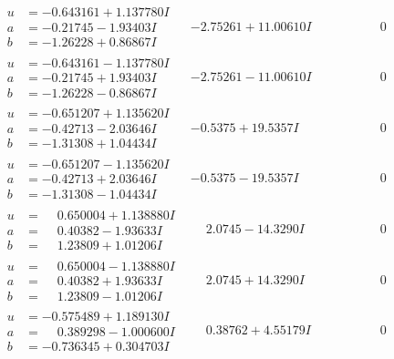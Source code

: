 \documentclass[1p]{elsarticle_modified}
\theoremstyle{definition}
\begin{document}
$$\begin{array}{c|c|c}
\begin{aligned}
u &= -0.643161 + 1.137780 I \\
a &= -0.21745 - 1.93403 I \\
b &= -1.26228 + 0.86867 I\end{aligned}
 & -2.75261 + 11.00610 I & \phantom{-0.000000 } 0 \\ \hline\begin{aligned}
u &= -0.643161 - 1.137780 I \\
a &= -0.21745 + 1.93403 I \\
b &= -1.26228 - 0.86867 I\end{aligned}
 & -2.75261 - 11.00610 I & \phantom{-0.000000 } 0 \\ \hline\begin{aligned}
u &= -0.651207 + 1.135620 I \\
a &= -0.42713 - 2.03646 I \\
b &= -1.31308 + 1.04434 I\end{aligned}
 & -0.5375 + 19.5357 I & \phantom{-0.000000 } 0 \\ \hline\begin{aligned}
u &= -0.651207 - 1.135620 I \\
a &= -0.42713 + 2.03646 I \\
b &= -1.31308 - 1.04434 I\end{aligned}
 & -0.5375 - 19.5357 I & \phantom{-0.000000 } 0 \\ \hline\begin{aligned}
u &= \phantom{-}0.650004 + 1.138880 I \\
a &= \phantom{-}0.40382 - 1.93633 I \\
b &= \phantom{-}1.23809 + 1.01206 I\end{aligned}
 & \phantom{-}2.0745 - 14.3290 I & \phantom{-0.000000 } 0 \\ \hline\begin{aligned}
u &= \phantom{-}0.650004 - 1.138880 I \\
a &= \phantom{-}0.40382 + 1.93633 I \\
b &= \phantom{-}1.23809 - 1.01206 I\end{aligned}
 & \phantom{-}2.0745 + 14.3290 I & \phantom{-0.000000 } 0 \\ \hline\begin{aligned}
u &= -0.575489 + 1.189130 I \\
a &= \phantom{-}0.389298 - 1.000600 I \\
b &= -0.736345 + 0.304703 I\end{aligned}
 & \phantom{-}0.38762 + 4.55179 I & \phantom{-0.000000 } 0 \\ \hline\begin{aligned}

\end{aligned}
\end{array}$$
\end{document}
